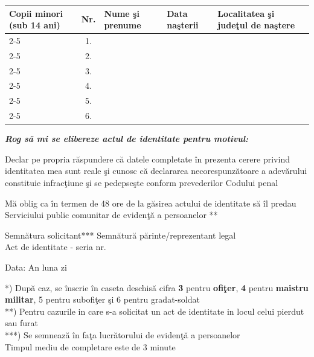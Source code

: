 \documentclass[11pt,a4paper]{article}
\newcommand{\fillline}[1][6cm]{\underline{\hspace{#1}}}
\newcommand{\fillbox}[1][0.4cm]{\framebox[#1]{\rule{0pt}{#1}}}
\begin{document}
\begin{tabularx}{\textwidth}{|m{2.4cm}|c|X|X|X|}
\hline
\multirow{7}{2.4cm}{Copii minori (sub 14 ani)} & Nr. & Nume şi prenume & Data naşterii & Localitatea şi judeţul de naştere \\
\cline{2-5}
 & 1. & & & \\
\cline{2-5}
 & 2. & & & \\
\cline{2-5}
 & 3. & & & \\
\cline{2-5}
 & 4. & & & \\
\cline{2-5}
 & 5. & & & \\
\cline{2-5}
 & 6. & & & \\
\hline
\end{tabularx}

\vspace{0.3cm}

\textit{\textbf{Rog să mi se elibereze actul de identitate pentru motivul:}}\\
\fillline[17cm]

\vspace{0.5cm}

Declar pe propria răspundere că datele completate în prezenta cerere privind identitatea mea sunt reale şi cunosc că declararea necorespunzătoare a adevărului constituie infracţiune şi se pedepseşte conform prevederilor Codului penal

\vspace{0.3cm}

Mă oblig ca în termen de 48 ore de la găsirea actului de identitate să îl predau Serviciului public comunitar de evidenţă a persoanelor **

\vspace{0.5cm}

Semnătura solicitant*** \fillline[4cm] \hfill Semnătură părinte/reprezentant legal \fillline[4cm]\\
\hspace*{8cm}\hfill Act de identitate - seria \fillline[1.5cm] nr. \fillline[3cm]

\vspace{0.5cm}

Data: \hspace{0.5cm} An \fillbox\fillbox\fillbox\fillbox \hspace{0.5cm} luna \fillbox\fillbox \hspace{0.5cm} zi \fillbox\fillbox

\vspace{0.5cm}
\hrulefill

\footnotesize
*) După caz, se înscrie în caseta deschisă cifra \textbf{3} pentru \textbf{ofiţer}, \textbf{4} pentru \textbf{maistru militar}, 5 pentru subofiţer şi 6 pentru gradat-soldat\\
**) Pentru cazurile in care s-a solicitat un act de identitate in locul celui pierdut sau furat\\
***) Se semnează în faţa lucrătorului de evidenţă a persoanelor\\
Timpul mediu de completare este de 3 minute
\end{document}

